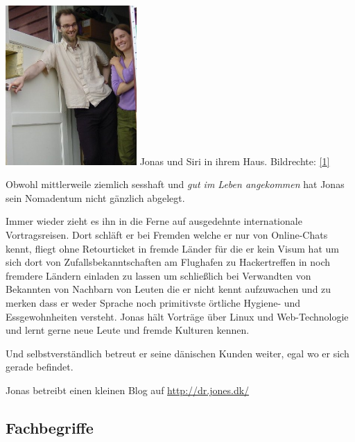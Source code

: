 \begin{center}
\includegraphics[width=5cm]{nomad/nomad-siri.jpg}
\footnotesize{Jonas und Siri in ihrem Haus. Bildrechte: \href{http://dr.jones.dk}{{[}1{]}}}
\end{center}

Obwohl mittlerweile ziemlich sesshaft und \emph{gut im Leben angekommen} hat Jonas sein Nomadentum nicht gänzlich abgelegt.

Immer wieder  zieht es ihn in die Ferne auf ausgedehnte internationale Vortragsreisen. Dort schläft er bei Fremden welche er nur von Online-Chats kennt, fliegt ohne Retourticket in fremde Länder für die er kein Visum hat um sich dort von Zufallsbekanntschaften am Flughafen zu Hackertreffen in noch fremdere Ländern einladen zu lassen um schließlich bei Verwandten von Bekannten von Nachbarn von Leuten die er nicht kennt aufzuwachen und zu merken dass er weder Sprache noch primitivste örtliche Hygiene- und Essgewohnheiten versteht. Jonas hält  Vorträge über Linux und Web-Technologie und lernt gerne neue Leute und fremde Kulturen kennen.

Und selbstverständlich betreut er seine dänischen Kunden weiter, egal wo er sich gerade befindet.

Jonas betreibt einen kleinen Blog auf \url{http://dr.jones.dk/} 



\subsection*{Fachbegriffe}

